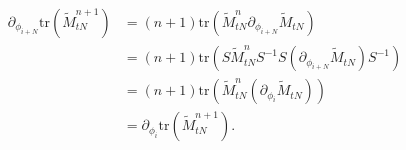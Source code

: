 \begin{equation}
 \begin{split}
  \partial_{\phi_{i+N}} \mathrm{tr} \left( \tilde{M}_{tN}^{n+1} \right)
  &= (n+1) \mathrm{tr} \left( \tilde{M}_{tN}^{n} \partial_{\phi_{i+N}}  \tilde{M}_{tN} \right) \\
  &= (n+1) \mathrm{tr} \left( S \tilde{M}_{tN}^{n}  S^{-1}  S ( \partial_{\phi_{i+N}}    \tilde{M}_{tN}) S^{-1} \right) \\
  &= (n+1)\mathrm{tr} \left( \tilde{M}_{tN}^{n}  ( \partial_{\phi_{i}} \tilde{M}_{tN}) \right) \\
  &= \partial_{\phi_{i}} \mathrm{tr} \left( \tilde{M}_{tN}^{n+1} \right) .
 \end{split}
\end{equation}

